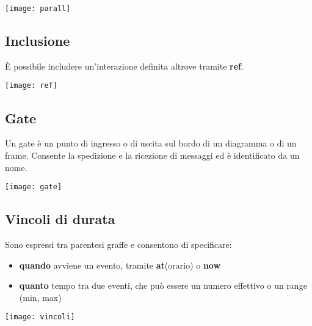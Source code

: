 \begin{center}
	\texttt{[image: parall]}
\end{center}

\subsection{Inclusione}
È possibile includere un'interazione definita altrove tramite \textbf{ref}.
\begin{center}
	\texttt{[image: ref]}
\end{center}

\subsection{Gate}
Un gate è un punto di ingresso o di uscita sul bordo di un diagramma o di un frame. Consente la spedizione e la ricezione di messaggi ed è identificato da un nome.
\begin{center}
	\texttt{[image: gate]}
\end{center}

\subsection{Vincoli di durata}
Sono espressi tra parentesi graffe e consentono di specificare:
\begin{itemize}
	\item \textbf{quando} avviene un evento, tramite \textbf{at}(orario) o \textbf{now}
	\item \textbf{quanto} tempo tra due eventi, che può essere un numero effettivo o un range (min, max)
\end{itemize}
\begin{center}
	\texttt{[image: vincoli]}
\end{center}